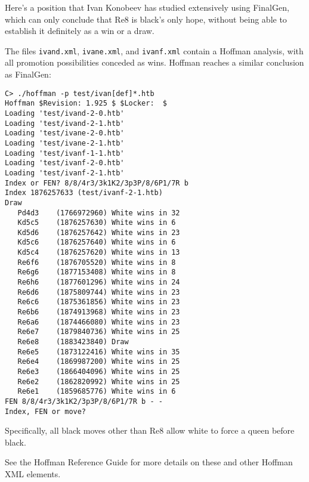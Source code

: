 \documentclass[11pt]{article}
\begin{document}

Here's a position that Ivan Konobeev has studied extensively using
FinalGen, which can only conclude that Re8 is black's only hope,
without being able to establish it definitely as a win or a draw.

\showboard

The files {\tt ivand.xml}, {\tt ivane.xml}, and {\tt ivanf.xml}
contain a Hoffman analysis, with all promotion possibilities conceded
as wins.  Hoffman reaches a similar conclusion as FinalGen:

\begin{verbatim}
C> ./hoffman -p test/ivan[def]*.htb
Hoffman $Revision: 1.925 $ $Locker:  $
Loading 'test/ivand-2-0.htb'
Loading 'test/ivand-2-1.htb'
Loading 'test/ivane-2-0.htb'
Loading 'test/ivane-2-1.htb'
Loading 'test/ivanf-1-1.htb'
Loading 'test/ivanf-2-0.htb'
Loading 'test/ivanf-2-1.htb'
Index or FEN? 8/8/4r3/3k1K2/3p3P/8/6P1/7R b
Index 1876257633 (test/ivanf-2-1.htb)
Draw
   Pd4d3    (1766972960) White wins in 32
   Kd5c5    (1876257630) White wins in 6
   Kd5d6    (1876257642) White wins in 23
   Kd5c6    (1876257640) White wins in 6
   Kd5c4    (1876257620) White wins in 13
   Re6f6    (1876705520) White wins in 8
   Re6g6    (1877153408) White wins in 8
   Re6h6    (1877601296) White wins in 24
   Re6d6    (1875809744) White wins in 23
   Re6c6    (1875361856) White wins in 23
   Re6b6    (1874913968) White wins in 23
   Re6a6    (1874466080) White wins in 23
   Re6e7    (1879840736) White wins in 25
   Re6e8    (1883423840) Draw
   Re6e5    (1873122416) White wins in 35
   Re6e4    (1869987200) White wins in 25
   Re6e3    (1866404096) White wins in 25
   Re6e2    (1862820992) White wins in 25
   Re6e1    (1859685776) White wins in 6
FEN 8/8/4r3/3k1K2/3p3P/8/6P1/7R b - -
Index, FEN or move? 
\end{verbatim}

Specifically, all black moves other than Re8 allow white to force
a queen before black.


See the Hoffman Reference Guide for more details on these and other
 Hoffman XML elements.
\end{document}
